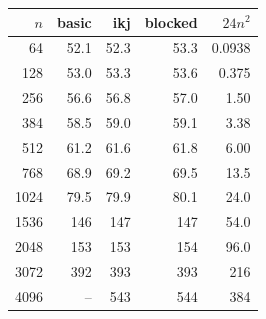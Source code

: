 \begin{tabular}{rrrrr}
\toprule
$n$ & basic & ikj & blocked & $24n^2$ \\
\midrule
64 & 52.1 & 52.3 & 53.3 & 0.0938 \\
128 & 53.0 & 53.3 & 53.6 & 0.375 \\
256 & 56.6 & 56.8 & 57.0 & 1.50 \\
384 & 58.5 & 59.0 & 59.1 & 3.38 \\
512 & 61.2 & 61.6 & 61.8 & 6.00 \\
768 & 68.9 & 69.2 & 69.5 & 13.5 \\
1024 & 79.5 & 79.9 & 80.1 & 24.0 \\
1536 & 146 & 147 & 147 & 54.0 \\
2048 & 153 & 153 & 154 & 96.0 \\
3072 & 392 & 393 & 393 & 216 \\
4096 & -- & 543 & 544 & 384 \\
\bottomrule
\end{tabular}
